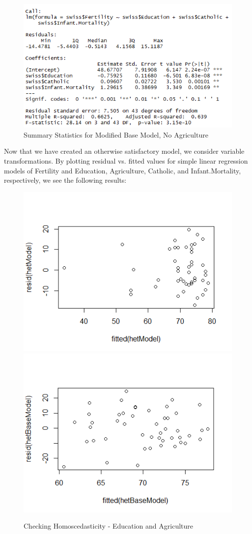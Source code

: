\documentclass[preprint,12pt]{elsarticle}
\begin{document}
\begin{figure}[h!]
\centering\includegraphics[width=0.7\linewidth]{SummaryStatsNoAgEx}
\caption{Summary Statistics for Modified Base Model, No Agriculture}
\end{figure}

\noindent Now that we have created an otherwise satisfactory model, we consider variable transformations. By plotting residual vs. fitted values for simple linear regression models of Fertility and Education, Agriculture, Catholic, and Infant.Mortality, respectively, we see the following results:
\begin{figure}[htp]
\includegraphics[width=.5\textwidth]{homoFertEdu}\hfill
\includegraphics[width=.5\textwidth]{homoFertAg}
\caption{Checking Homoscedasticity - Education and Agriculture}
\end{figure}
\newpage
\end{document}
